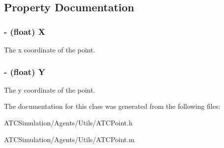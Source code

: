 \subsection{\-Property \-Documentation}
\hypertarget{interface_a_t_c_point_a8ead9bbb9589229db82c8fe997662eca}{
\subsubsection[{\-X}]{\setlength{\rightskip}{0pt plus 5cm}-\/ (float) \-X}}
\label{interface_a_t_c_point_a8ead9bbb9589229db82c8fe997662eca}
\-The x coordinate of the point. \hypertarget{interface_a_t_c_point_a65758c3125ed16ddce2a3d1607cf70d2}{
\subsubsection[{\-Y}]{\setlength{\rightskip}{0pt plus 5cm}-\/ (float) \-Y}}
\label{interface_a_t_c_point_a65758c3125ed16ddce2a3d1607cf70d2}
\-The y coordinate of the point. 

\-The documentation for this class was generated from the following files\-:\begin{DoxyCompactItemize}
\item 
\-A\-T\-C\-Simulation/\-Agents/\-Utils/\-A\-T\-C\-Point.\-h\item 
\-A\-T\-C\-Simulation/\-Agents/\-Utils/\-A\-T\-C\-Point.\-m\end{DoxyCompactItemize}
